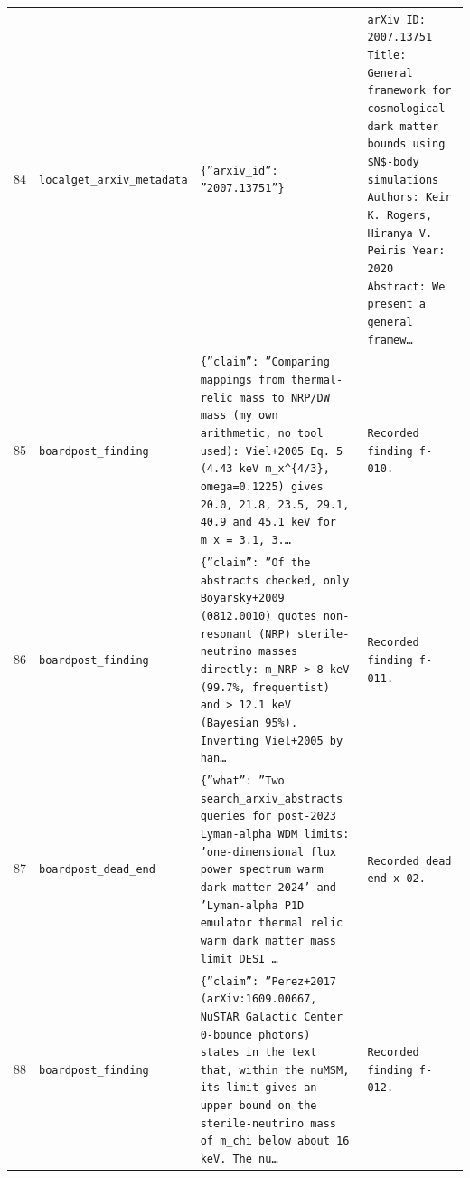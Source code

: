 \documentclass[11pt,a4paper]{article}
\begin{document}
\begin{longtable}{@{}p{}p{}p{}p{}@{}}
84 & \texttt{local}\newline\texttt{get\_\allowbreak{}arxiv\_\allowbreak{}metadata} & \texttt{\{''arxiv\_\allowbreak{}id'':\allowbreak{} ''2007.13751''\}\allowbreak{}} & \texttt{arXiv ID:\allowbreak{} 2007.13751 Title:\allowbreak{} General framework for cosmological dark matter bounds using \$N\$-body simulations Authors:\allowbreak{} Keir K. Rogers,\allowbreak{} Hiranya V. Peiris Year:\allowbreak{} 2020 Abstract:\allowbreak{} We present a general framew\ldots{}\allowbreak{}} \\
85 & \texttt{board}\newline\texttt{post\_\allowbreak{}finding} & \texttt{\{''claim'':\allowbreak{} ''Comparing mappings from thermal-relic mass to NRP/\allowbreak{}DW mass (my own arithmetic,\allowbreak{} no tool used)\allowbreak{}:\allowbreak{} Viel+2005 Eq. 5 (4.43 keV m\_\allowbreak{}x\textasciicircum{}\allowbreak{}\{4/\allowbreak{}3\}\allowbreak{},\allowbreak{} omega=\allowbreak{}0.1225)\allowbreak{} gives 20.0,\allowbreak{} 21.8,\allowbreak{} 23.5,\allowbreak{} 29.1,\allowbreak{} 40.9 and 45.1 keV for m\_\allowbreak{}x =\allowbreak{} 3.1,\allowbreak{} 3.\ldots{}\allowbreak{}} & \texttt{Recorded finding f-010.} \\
86 & \texttt{board}\newline\texttt{post\_\allowbreak{}finding} & \texttt{\{''claim'':\allowbreak{} ''Of the abstracts checked,\allowbreak{} only Boyarsky+2009 (0812.0010)\allowbreak{} quotes non-resonant (NRP)\allowbreak{} sterile-neutrino masses directly:\allowbreak{} m\_\allowbreak{}NRP \textgreater{}\allowbreak{} 8 keV (99.7\%,\allowbreak{} frequentist)\allowbreak{} and \textgreater{}\allowbreak{} 12.1 keV (Bayesian 95\%)\allowbreak{}. Inverting Viel+2005 by han\ldots{}\allowbreak{}} & \texttt{Recorded finding f-011.} \\
87 & \texttt{board}\newline\texttt{post\_\allowbreak{}dead\_\allowbreak{}end} & \texttt{\{''what'':\allowbreak{} ''Two search\_\allowbreak{}arxiv\_\allowbreak{}abstracts queries for post-2023 Lyman-alpha WDM limits:\allowbreak{} 'one-dimensional flux power spectrum warm dark matter 2024' and 'Lyman-alpha P1D emulator thermal relic warm dark matter mass limit DESI \ldots{}\allowbreak{}} & \texttt{Recorded dead end x-02.} \\
88 & \texttt{board}\newline\texttt{post\_\allowbreak{}finding} & \texttt{\{''claim'':\allowbreak{} ''Perez+2017 (arXiv:\allowbreak{}1609.00667,\allowbreak{} NuSTAR Galactic Center 0-bounce photons)\allowbreak{} states in the text that,\allowbreak{} within the nuMSM,\allowbreak{} its limit gives an upper bound on the sterile-neutrino mass of m\_\allowbreak{}chi below about 16 keV. The nu\ldots{}\allowbreak{}} & \texttt{Recorded finding f-012.} \\

\end{longtable}
\end{document}
